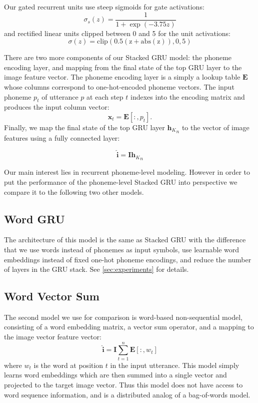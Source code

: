 Our gated recurrent units use steep sigmoids for gate activations: \[
\sigma_s(z) = \frac{1}{1 + \exp(-3.75z)} 
\]
and rectified linear units clipped between 0 and 5 for the unit
activations:
\[
\sigma(z) = \mathrm{clip(0.5(z+\mathrm{abs}(z)), 0, 5)}
\]

There are two more components of our {\sc Stacked GRU} model: the
phoneme encoding layer, and mapping from the final state of the top GRU
layer to the image feature vector.
The phoneme encoding layer is a simply a lookup table $\mathbf{E}$ whose
columns correspond to one-hot-encoded phoneme vectors. The input
phoneme $p_t$ of utterance $p$ at each step $t$ indexes into the
encoding matrix and produces the input column vector:
\begin{equation}
  \mathbf{x}_t = \mathbf{E}[:,p_t].
\end{equation}
Finally, we map the final state of the top GRU layer ${\mathbf{h}_K}_n$
to the vector of image features using a fully connected layer:

\begin{equation}
  \hat{\mathbf{i}} = \mathbf{I} {\mathbf{h}_K}_n
\end{equation}

Our main interest lies in  recurrent phoneme-level modeling. However in order to
put the performance of the phoneme-level {\sc Stacked GRU} into
perspective we compare it to the following two other models.


\subsection{Word GRU}
The architecture of this model is the same as {\sc Stacked GRU} with
the difference that we use words instead of phonemes as input symbols,
use learnable word embeddings instead of fixed one-hot phoneme
encodings, and reduce the number of layers in the GRU stack. See
\ref{sec:experiments} for details.
\subsection{Word Vector Sum}
The second model we use for comparison is word-based non-sequential
model, consisting of a word embedding matrix, a vector sum operator,
and a mapping to the image vector feature vector:
\begin{equation}
  \label{eq:sum}
  \hat{\mathbf{i}} = \mathbf{I} \sum_{t=1}^n \mathbf{E}[:,w_t]
\end{equation}
where $w_t$ is the word at position $t$ in the input utterance.
This model simply learns word embeddings which are then summed into a
single vector and projected to the target image vector. Thus this model does
not have access to word sequence information, and is a distributed
analog of a bag-of-words model.
